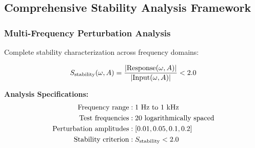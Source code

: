 \documentclass[11pt]{article}
\begin{document}
\subsection{Comprehensive Stability Analysis Framework}

\subsubsection{Multi-Frequency Perturbation Analysis}
Complete stability characterization across frequency domains:

\begin{equation}
S_{\rm stability}(\omega,A) = \frac{|\text{Response}(\omega,A)|}{|\text{Input}(\omega,A)|} < 2.0
\end{equation}

\textbf{Analysis Specifications:}
\begin{align}
\text{Frequency range} &: 1 \text{ Hz to } 1 \text{ kHz} \\
\text{Test frequencies} &: 20 \text{ logarithmically spaced} \\
\text{Perturbation amplitudes} &: [0.01, 0.05, 0.1, 0.2] \\
\text{Stability criterion} &: S_{\rm stability} < 2.0
\end{align}
\end{document}
